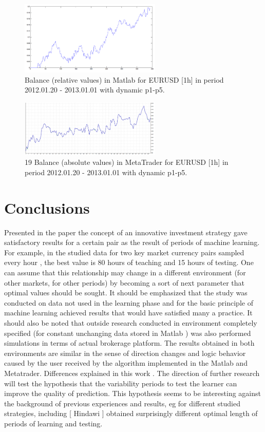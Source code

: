 \documentclass[runningheads,a4paper]{llncs}
\begin{document}
\begin{figure}[h!]
\centering
\includegraphics[width = 0.6\textwidth]{figures/rys18.png}
\caption{Balance (relative values) in Matlab for EURUSD [1h] in period 2012.01.20 - 2013.01.01 with dynamic p1-p5.}
\label{fig:fig18}
\end{figure}
\FloatBarrier
\begin{figure}[h!]
\centering
\includegraphics[width = 0.6\textwidth]{figures/rys19.png}
\caption{19 Balance (absolute values) in MetaTrader for EURUSD [1h] in period 2012.01.20 - 2013.01.01 with dynamic p1-p5.}
\label{fig:fig19}
\end{figure}
\FloatBarrier

\section{Conclusions}

Presented in the paper the concept of an innovative investment strategy gave satisfactory results for a certain pair as the result of periods of machine learning. For example, in the studied data for two key market currency pairs sampled every hour , the best value is 80 hours of teaching and 15 hours of testing. One can assume that this relationship may change in a different environment (for other markets, for other periods) by becoming a sort of next parameter that optimal values should be sought. It should be emphasized that the study was conducted on data not used in the learning phase and for the basic principle of machine learning achieved results that would have satisfied many a practice. It should also be noted that outside research conducted in environment completely specified (for constant unchanging data stored in Matlab ) was also performed simulations in terms of actual brokerage platform. The results obtained in both environments are similar in the sense of direction changes and logic behavior caused by the user received by the algorithm implemented in the Matlab and Metatrader. Differences explained in this work .
The direction of further research will test the hypothesis that the variability periods to test the learner can improve the quality of prediction. This hypothesis seems to be interesting against the background of previous experiences and results, eg for different studied strategies, including [ Hindawi ] obtained surprisingly different optimal length of periods of learning and testing.
\end{document}

